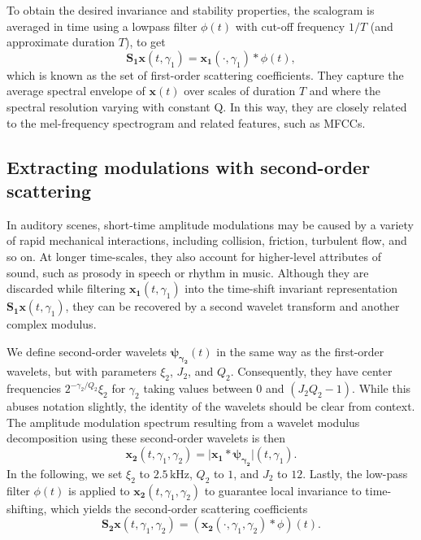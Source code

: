 \documentclass[smallextended]{svjour3}
\begin{document}
To obtain the desired invariance and stability properties, the scalogram is averaged in time using a lowpass filter $\phi(t)$ with cut-off frequency $1/T$ (and approximate duration $T$), to get
\begin{equation}
\mathbf{S_1}\boldsymbol{x}(t, \gamma_1) = \boldsymbol{x_1}(\cdot, \gamma_1) \ast \phi(t),
\end{equation}
which is known as the set of first-order scattering coefficients. They capture the average spectral envelope of $\boldsymbol{x}(t)$ over scales of duration $T$ and where the spectral resolution varying with constant Q. In this way, they are closely related to the mel-frequency spectrogram and related features, such as MFCCs.

\subsection{Extracting modulations with second-order scattering}
In auditory scenes, short-time amplitude modulations may be caused by a variety of rapid mechanical interactions, including collision, friction, turbulent flow, and so on.
At longer time-scales, they also account for higher-level attributes of sound, such as prosody in speech or rhythm in music.
Although they are discarded while filtering $\boldsymbol{x_1}(t,\gamma_1)$ into the time-shift invariant representation $\mathbf{S_1}\boldsymbol{x}(t,\gamma_1)$, they can be recovered by a second wavelet transform and another complex modulus.

We define second-order wavelets $\boldsymbol{\psi_{\gamma_2}}(t)$ in the same way as the first-order wavelets, but with parameters $\xi_2$, $J_2$, and $Q_2$. Consequently, they have center frequencies $2^{-\gamma_2/Q_2}\xi_2$ for $\gamma_2$ taking values between $0$ and $(J_2 Q_2 - 1)$. While this abuses notation slightly, the identity of the wavelets should be clear from context.
The amplitude modulation spectrum resulting from a wavelet modulus decomposition using these second-order wavelets is then
\begin{equation}
\boldsymbol{x_2}(t,\gamma_1,\gamma_2) =
\vert \boldsymbol{x_1} \ast \boldsymbol{\psi_{\gamma_2}} \vert(t,\gamma_1).
\end{equation}
In the following, we set $\xi_2$ to $2.5\,\mathrm{kHz}$, $Q_2$ to $1$, and $J_2$ to $12$. Lastly, the low-pass filter $\phi(t)$ is applied to $\boldsymbol{x_2}(t, \gamma_1, \gamma_2)$ to guarantee local invariance to time-shifting, which yields the second-order scattering coefficients
\begin{equation}
\mathbf{S_2}\boldsymbol{x}(t,\gamma_1,\gamma_2) =
(\boldsymbol{x_2}(\cdot,\gamma_1,\gamma_2) \ast \phi)(t).
\end{equation}
\end{document}

